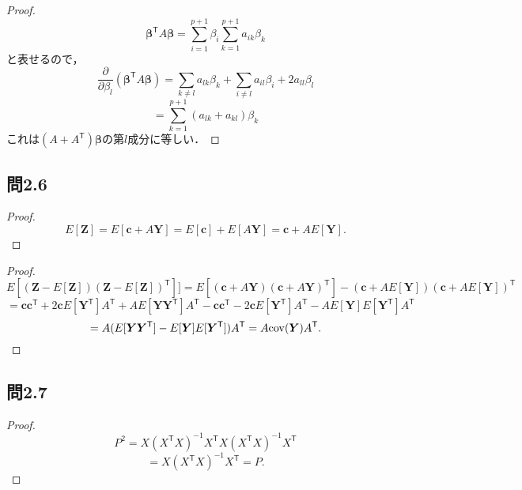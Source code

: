 \documentclass[pdflatex,ja=standard]{bxjsarticle}
\begin{document}
\begin{proof}
\begin{equation}
\bm{\beta}^{\mathsf{T}} A \bm{\beta} =  \sum_{i=1}^{p+1} \beta_i \sum_{k=1}^{p+1} a_{ik} \beta_k
\end{equation}
と表せるので，
\begin{equation}
\frac{\partial}{\partial \beta_l} \left( \bm{\beta}^{\mathsf{T}} A \bm{\beta} \right) = \sum_{k \neq l} a_{lk} \beta_k + \sum_{i \neq l} a_{il} \beta_i + 2 a_{ll} \beta_l
\end{equation}
\begin{equation}
= \sum_{k=1}^{p+1} (a_{lk} + a_{kl}) \beta_k
\end{equation}
これは$(A + A^{\mathsf{T}}) \bm{\beta}$の第$l$成分に等しい．
\end{proof}

\subsection*{問2.6}
\begin{proof}
\begin{equation}
E[\bm{Z}] = E[\bm{c} + A \bm{Y}] = E[\bm{c}] + E[A\bm{Y}] = \bm{c} + A E[\bm{Y}].
\end{equation}
\end{proof}

\begin{proof}
\begin{equation}
E[(\bm{Z} - E[\bm{Z}])(\bm{Z} - E[\bm{Z}])^{\mathsf{T}}]] = E[(\bm{c} + A\bm{Y})(\bm{c} + A\bm{Y})^{\mathsf{T}}] - (\bm{c} + A E[\bm{Y}])(\bm{c} + A E[\bm{Y}])^{\mathsf{T}}
\end{equation}
\begin{equation}
= \bm{c} \bm{c}^{\mathsf{T}} + 2 \bm{c} E[\bm{Y}^{\mathsf{T}}] A^{\mathsf{T}} + A E[ \bm{Y} \bm{Y}^{\mathsf{T}}] A^{\mathsf{T}} - \bm{c} \bm{c}^{\mathsf{T}} - 2 \bm{c} E[\bm{Y}^{\mathsf{T}}] A^{\mathsf{T}} -  A E[ \bm{Y}] E[ \bm{Y}^{\mathsf{T}}] A^{\mathsf{T}} 
\end{equation}
\begin{equation}
= A(E[\bm{Y}\bm{Y}^{\mathsf{T}}] - E[\bm{Y}]E[\bm{Y}^{\mathsf{T}}])A^{\mathsf{T}} = A {\rm cov} (\bm{Y}) A^{\mathsf{T}}.
\end{equation}

\end{proof}

\subsection*{問2.7}
\begin{proof}
\begin{equation}
P^2 = X (X^{\mathsf{T}} X )^{-1} X^{\mathsf{T}} X (X^{\mathsf{T}} X )^{-1} X^{\mathsf{T}}
\end{equation}
\begin{equation}
= X (X^{\mathsf{T}} X )^{-1} X^{\mathsf{T}} = P.
\end{equation}
\end{proof}
\end{document}
